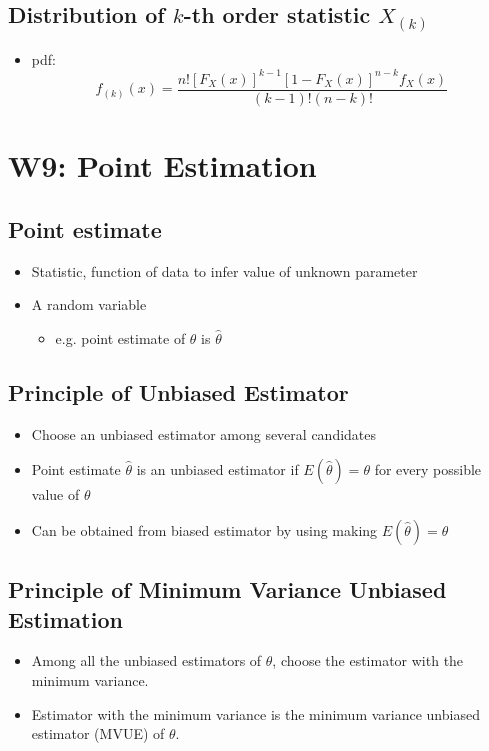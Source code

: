 \documentclass[a4paper]{article}
\begin{document}
\subsection{Distribution of \texorpdfstring{$k$-th}{k-th} order statistic \texorpdfstring{$X_{(k)}$}{X(k)}}
\begin{itemize}
    \item pdf:
    $$f_{(k)}(x) = \frac{n!\left[F_{X}(x)\right]^{k-1}\left[1-F_{X}(x)\right]^{n-k}f_{X}(x)}{(k-1)!(n-k)!}$$
\end{itemize}
\newpage
\section{W9: Point Estimation}
\subsection{Point estimate}
\begin{itemize}
    \item Statistic, function of data to infer value of unknown parameter
    \item A random variable
    \begin{itemize}[label=$\circ$]
        \item e.g. point estimate of $\theta$ is $\hat{\theta}$
    \end{itemize}
\end{itemize}
\subsection{Principle of Unbiased Estimator}
\begin{itemize}
    \item Choose an unbiased estimator among several candidates
    \item Point estimate $\hat{\theta}$ is an unbiased estimator if $E(\hat{\theta}) = \theta$ for every possible value of $\theta$
    \item Can be obtained from biased estimator by using making $E(\hat{\theta}) = \theta$
\end{itemize}
\subsection{Principle of Minimum Variance Unbiased Estimation}
\begin{itemize}
    \item Among all the unbiased estimators of $\theta$, choose the estimator with the minimum variance.
    \item Estimator with the minimum variance is the minimum variance unbiased estimator (MVUE) of $\theta$.
\end{itemize}
\newpage
\end{document}
